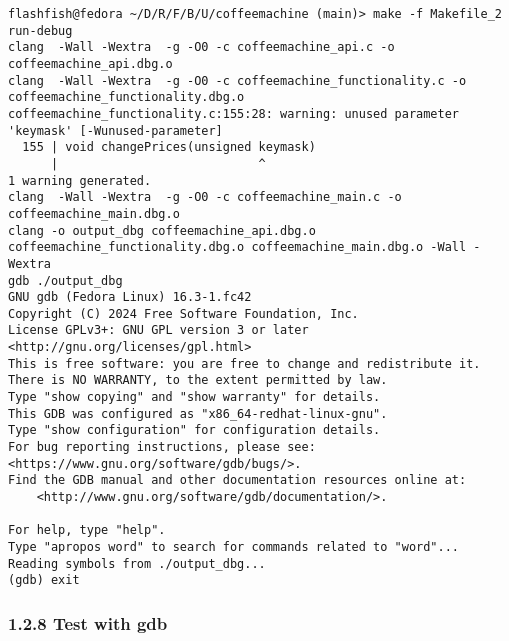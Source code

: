 \documentclass{report}
\begin{document}
\begin{lstlisting}[style=cppstyle, title=\texttt{Terminal Output}]
flashfish@fedora ~/D/R/F/B/U/coffeemachine (main)> make -f Makefile_2 run-debug
clang  -Wall -Wextra  -g -O0 -c coffeemachine_api.c -o coffeemachine_api.dbg.o
clang  -Wall -Wextra  -g -O0 -c coffeemachine_functionality.c -o coffeemachine_functionality.dbg.o
coffeemachine_functionality.c:155:28: warning: unused parameter 'keymask' [-Wunused-parameter]
  155 | void changePrices(unsigned keymask)
      |                            ^
1 warning generated.
clang  -Wall -Wextra  -g -O0 -c coffeemachine_main.c -o coffeemachine_main.dbg.o
clang -o output_dbg coffeemachine_api.dbg.o coffeemachine_functionality.dbg.o coffeemachine_main.dbg.o -Wall -Wextra
gdb ./output_dbg
GNU gdb (Fedora Linux) 16.3-1.fc42
Copyright (C) 2024 Free Software Foundation, Inc.
License GPLv3+: GNU GPL version 3 or later <http://gnu.org/licenses/gpl.html>
This is free software: you are free to change and redistribute it.
There is NO WARRANTY, to the extent permitted by law.
Type "show copying" and "show warranty" for details.
This GDB was configured as "x86_64-redhat-linux-gnu".
Type "show configuration" for configuration details.
For bug reporting instructions, please see:
<https://www.gnu.org/software/gdb/bugs/>.
Find the GDB manual and other documentation resources online at:
    <http://www.gnu.org/software/gdb/documentation/>.

For help, type "help".
Type "apropos word" to search for commands related to "word"...
Reading symbols from ./output_dbg...
(gdb) exit
\end{lstlisting}

\subsubsection*{1.2.8 Test with gdb}
\end{document}
